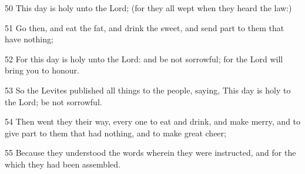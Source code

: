 \par 50 This day is holy unto the Lord; (for they all wept when they heard the law:)
\par 51 Go then, and eat the fat, and drink the sweet, and send part to them that have nothing;
\par 52 For this day is holy unto the Lord: and be not sorrowful; for the Lord will bring you to honour.
\par 53 So the Levites published all things to the people, saying, This day is holy to the Lord; be not sorrowful.
\par 54 Then went they their way, every one to eat and drink, and make merry, and to give part to them that had nothing, and to make great cheer;
\par 55 Because they understood the words wherein they were instructed, and for the which they had been assembled.

